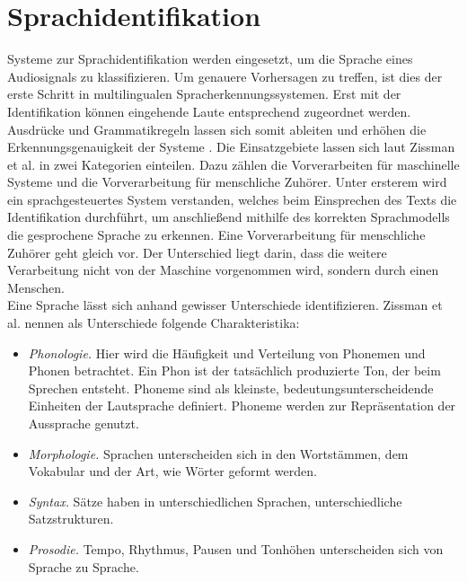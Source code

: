 \section{Sprachidentifikation}
Systeme zur Sprachidentifikation werden eingesetzt, um die Sprache eines Audiosignals zu klassifizieren. Um genauere Vorhersagen zu treffen, ist dies der erste Schritt in multilingualen Spracherkennungssystemen. Erst mit der Identifikation können eingehende Laute entsprechend zugeordnet werden. Ausdrücke und Grammatikregeln lassen sich somit ableiten und erhöhen die Erkennungsgenauigkeit der Systeme \cite{Bartz.2017}.
Die Einsatzgebiete lassen sich laut Zissman et al. \cite{Zissman.2001} in zwei Kategorien einteilen. Dazu zählen die Vorverarbeiten für maschinelle Systeme und die Vorverarbeitung für menschliche Zuhörer. Unter ersterem wird ein sprachgesteuertes System verstanden, welches beim Einsprechen des Texts die Identifikation durchführt, um anschließend mithilfe des korrekten Sprachmodells die gesprochene Sprache zu erkennen. Eine Vorverarbeitung für menschliche Zuhörer geht gleich vor. Der Unterschied liegt darin, dass die weitere Verarbeitung nicht von der Maschine vorgenommen wird, sondern durch einen Menschen.
\\
Eine Sprache lässt sich anhand gewisser Unterschiede identifizieren. Zissman et al. \cite{Zissman.2001} nennen als Unterschiede folgende Charakteristika:
\begin{itemize}
\item \textit{Phonologie.} Hier wird die Häufigkeit und Verteilung von Phonemen und Phonen betrachtet. Ein Phon ist der tatsächlich produzierte Ton, der beim Sprechen entsteht. Phoneme sind als kleinste, bedeutungsunterscheidende Einheiten der Lautsprache definiert. Phoneme werden zur Repräsentation der Aussprache genutzt.
\item \textit{Morphologie.} Sprachen unterscheiden sich in den Wortstämmen, dem Vokabular und der Art, wie Wörter geformt werden.
\item \textit{Syntax.} Sätze haben in unterschiedlichen Sprachen, unterschiedliche Satzstrukturen.
\item \textit{Prosodie.} Tempo, Rhythmus, Pausen und Tonhöhen unterscheiden sich von Sprache zu Sprache.
\end{itemize}

